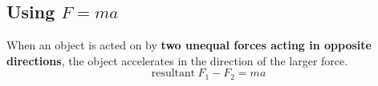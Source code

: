 \subsection{Using $F=ma$}

When an object is acted on by \textbf{two unequal forces acting in opposite directions}, the object accelerates in the direction of the larger force.
$$\text{resultant}\ F_1-F_2=ma$$
